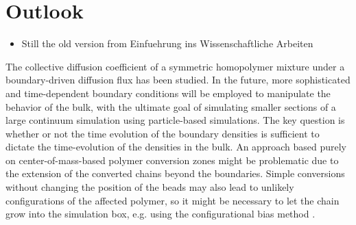 \documentclass[bachelor,       %
               oneside,        %
               BCOR10mm,       %
               ngerman, english %
               ]{GAUBM}
\begin{document}
\chapter{Outlook}

\begin{itemize}
    \item Still the old version from Einfuehrung ins Wissenschaftliche Arbeiten
\end{itemize}

The collective diffusion coefficient of a symmetric homopolymer mixture under a boundary-driven diffusion flux has been studied. In the future, more sophisticated and time-dependent boundary conditions will be employed to manipulate the behavior of the bulk, with the ultimate goal of simulating smaller sections of a large continuum simulation using particle-based simulations. The key question is whether or not the time evolution of the boundary densities is sufficient to dictate the time-evolution of the densities in the bulk. An approach based purely on center-of-mass-based polymer conversion zones might be problematic due to the extension of the converted chains beyond the boundaries. Simple conversions without changing the position of the beads may also lead to unlikely configurations of the affected polymer, so it might be necessary to let the chain grow into the simulation box, e.g. using the configurational bias method \cite{ConfBias}.






 


\end{document}

